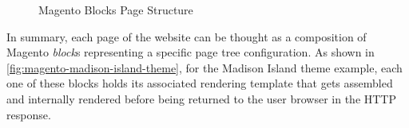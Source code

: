 \vspace{0.5cm}
\begin{figure}[H]
  \centering
  \qquad
  \caption{Magento Blocks Page Structure}%
  \label{fig:magento-term-blocks}%
\end{figure}


In summary, each page of the website can be thought as a composition of Magento \textit{block}s representing a specific page tree configuration. As shown in \ref{fig:magento-madison-island-theme}, for the Madison Island theme example, each one of these blocks holds its associated rendering template that gets assembled and internally rendered before being returned to the user browser in the HTTP response.

